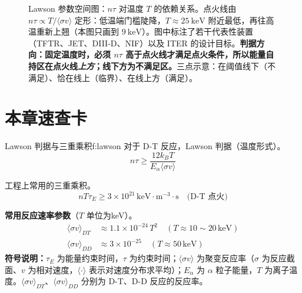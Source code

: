 \begin{figure}[htbp]
    \caption{Lawson 参数空间图：$n\tau$ 对温度 $T$ 的依赖关系。点火线由 $n\tau\propto T/\langle\sigma v\rangle$ 定形：低温端门槛陡降，$T\approx25\ \mathrm{keV}$ 附近最低，再往高温重新上翘（本图只画到 $9\ \mathrm{keV}$）。图中标注了若干代表性装置（TFTR、JET、DIII-D、NIF）以及 ITER 的设计目标。\textbf{判据方向：固定温度时，必须 $n\tau$ 高于点火线才满足点火条件，所以能量自持区在点火线\emph{上方}；线下方为不满足区。}三点示意：在阈值线下（不满足）、恰在线上（临界）、在线上方（满足）。}
    \label{fig:lawson}
\end{figure}


\clearpage          %
\section{本章速查卡}

\begin{formulabox}{Lawson 判据与三重乘积}{f:lawson}
对于 D-T 反应，Lawson 判据（温度形式）。
\begin{equation}
    n\tau \geq \frac{12k_B T}{E_{\alpha}\langle\sigma v\rangle}
\label{eq:ch10-lawson-simplified-ex}
\end{equation}

工程上常用的三重乘积。
\[
    nT\tau_E \geq 3\times10^{21}\,\mathrm{keV\cdot m^{-3}\cdot s}\quad\text{(D-T 点火)}
\]

\textbf{常用反应速率参数}（$T$ 单位为keV）。
\begin{align*}
    \langle\sigma v\rangle_{DT} &\approx 1.1\times10^{-24}\,T^2\quad (T\approx10\sim20\,\mathrm{keV})\\
    \langle\sigma v\rangle_{DD} &\approx 3\times10^{-25}\quad (T\approx50\,\mathrm{keV})
\end{align*}
\textbf{符号说明：}$\tau_E$ 为能量约束时间，$\tau$ 为约束时间；$\langle\sigma v\rangle$ 为聚变反应率（$\sigma$ 为反应截面、$v$ 为相对速度，$\langle\cdot\rangle$ 表示对速度分布求平均）；$E_{\alpha}$ 为 $\alpha$ 粒子能量，$T$ 为离子温度。$\langle\sigma v\rangle_{DT}$、$\langle\sigma v\rangle_{DD}$ 分别为 D-T、D-D 反应的反应率。
\end{formulabox}


